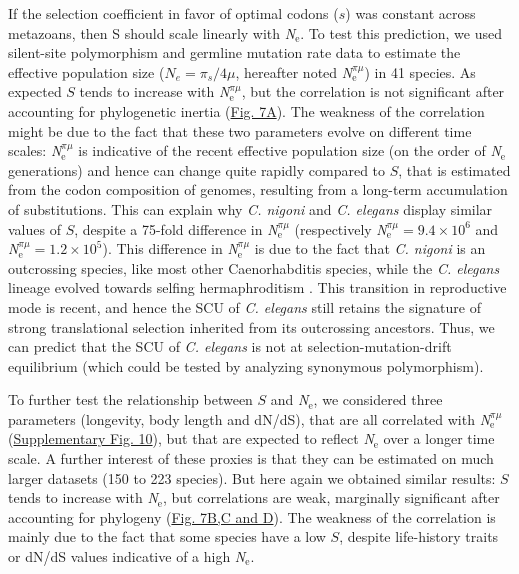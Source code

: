 If the selection coefficient in favor of optimal codons ($s$) was constant across metazoans, then S should scale linearly with \textit{N}$_{\text{e}}$. To test this prediction, we used silent-site polymorphism and germline mutation rate data \citep{lynch_divergence_2023} to estimate the effective population size ($N_{e}=\pi_{s}/4\mu$, hereafter noted \textit{N}$_{\text{e}}^{\pi\mu}$) in 41 species. As expected $S$ tends to increase with \textit{N}$_{\text{e}}^{\pi\mu}$, but the correlation is not significant after accounting for phylogenetic inertia (\hyperref[fig:CU7]{Fig. 7A}). The weakness of the correlation might be due to the fact that these two parameters evolve on different time scales: \textit{N}$_{\text{e}}^{\pi\mu}$ is indicative of the recent effective population size (on the order of \textit{N}$_{\text{e}}$ generations) and hence can change quite rapidly compared to $S$, that is estimated from the codon composition of genomes, resulting from a long-term accumulation of substitutions. This can explain why \textit{C. nigoni} and \textit{C. elegans} display similar values of $S$, despite a 75-fold difference in \textit{N}$_{\text{e}}^{\pi\mu}$ (respectively \textit{N}$_{\text{e}}^{\pi\mu} =9.4\times 10^{6}$ and \textit{N}$_{\text{e}}^{\pi\mu}=1.2\times 10^{5}$). This difference in \textit{N}$_{\text{e}}^{\pi\mu}$ is due to the fact that \textit{C. nigoni} is an outcrossing species, like most other Caenorhabditis species, while the \textit{C. elegans} lineage evolved towards selfing hermaphroditism \citep{li_specialist_2014, vielle_convergent_2016}. This transition in reproductive mode is recent, and hence the SCU of \textit{C. elegans} still retains the signature of strong translational selection inherited from its outcrossing ancestors. Thus, we can predict that the SCU of \textit{C. elegans} is not at selection-mutation-drift equilibrium (which could be tested by analyzing synonymous polymorphism). 

To further test the relationship between $S$ and \textit{N}$_{\text{e}}$, we considered three parameters (longevity, body length and dN/dS), that are all correlated with \textit{N}$_{\text{e}}^{\pi\mu}$ (\hyperref[suppfig:CU10]{Supplementary Fig. 10}), but that are expected to reflect \textit{N}$_{\text{e}}$ over a longer time scale. A further interest of these proxies is that they can be estimated on much larger datasets (150 to 223 species). But here again we obtained similar results: $S$ tends to increase with \textit{N}$_{\text{e}}$, but correlations are weak, marginally significant after accounting for phylogeny (\hyperref[fig:CU7]{Fig. 7B,C and D}). The weakness of the correlation is mainly due to the fact that some species have a low $S$, despite life-history traits or dN/dS values indicative of a high \textit{N}$_{\text{e}}$.

